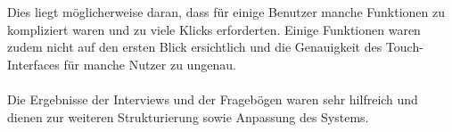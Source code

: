 Dies liegt möglicherweise daran, dass für einige Benutzer manche Funktionen zu kompliziert waren und zu viele Klicks erforderten.
Einige Funktionen waren zudem nicht auf den ersten Blick ersichtlich und die Genauigkeit des Touch-Interfaces für manche Nutzer zu ungenau.
\\
\\
Die Ergebnisse der Interviews und der Fragebögen waren sehr hilfreich und dienen zur weiteren Strukturierung sowie Anpassung des Systems.





